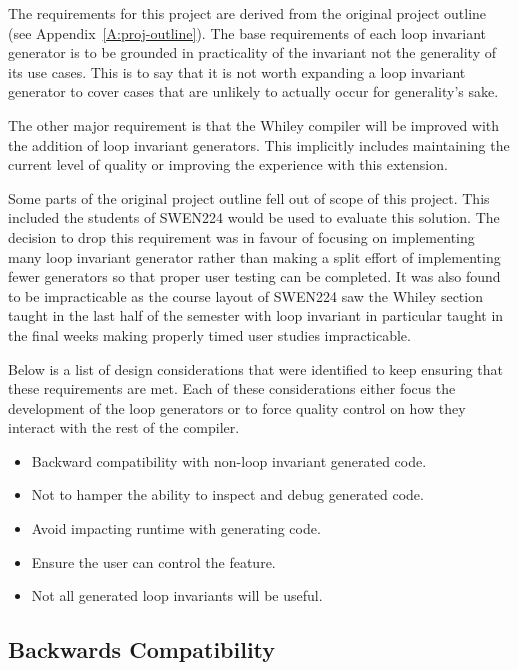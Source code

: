 The requirements for this project are derived from the original project
outline (see Appendix~\ref{A:proj-outline}).
The base requirements of each loop invariant generator is to be grounded
in practicality of the invariant not the generality of its use cases.
This is to say that it is not worth expanding a loop invariant
generator to cover cases that are unlikely to actually occur 
for generality’s sake.

The other major requirement is that the Whiley compiler will be improved
with the addition of loop invariant generators.
This implicitly includes maintaining the current level of quality or
improving the experience with this extension.

Some parts of the original project outline fell out of scope of this project.
This included the students of SWEN224 would be used to evaluate this solution.
The decision to drop this requirement was in favour of focusing on implementing
many loop invariant generator rather than making a split effort of implementing
fewer generators so that proper user testing can be completed.
It was also found to be impracticable as the course layout of SWEN224 saw the
Whiley section taught in the last half of the semester with loop invariant in
particular taught in the final weeks making properly timed user studies
impracticable.



Below is a list of design considerations that were identified to keep ensuring
that these requirements are met.
Each of these considerations either focus the development of the loop
generators or to force quality control on how they interact with the rest of the
compiler.

\begin{itemize}
    \item{Backward compatibility with non-loop invariant generated code.}
    \item{Not to hamper the ability to inspect and debug generated code.}
    \item{Avoid impacting runtime with generating code.}
    \item{Ensure the user can control the feature.}
    \item{Not all generated loop invariants will be useful.}
\end{itemize}

\subsection{Backwards Compatibility}

